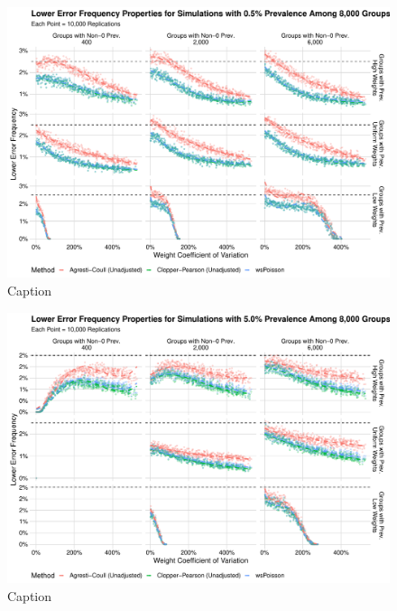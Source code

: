 \documentclass[AMA,STIX1COL]{WileyNJD-v2}
\begin{document}
\begin{figure}
    \centering
    \includegraphics[width=\textwidth]{figures/perfect_lower_error_frequency_8000_0_005_reduced.pdf}
    \caption{Caption}
    \label{fig:perfect_lower_error_frequency_8000_0_005_reduced}
\end{figure}

\begin{figure}
    \centering
    \includegraphics[width=\textwidth]{figures/perfect_lower_error_frequency_8000_0_05_reduced.pdf}
    \caption{Caption}
    \label{fig:perfect_lower_error_frequency_8000_0_05_reduced.pdf}
\end{figure}
\end{document}
